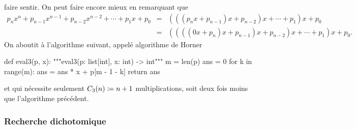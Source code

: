 \documentclass{magnolia}
\begin{document}
faire sentir.  On peut faire encore mieux en remarquant que
\begin{eqnarray*}
p_n x^n+p_{n-1}x^{n-1}+p_{n-2}x^{n-2}+\cdots+p_1 x+p_0
&=&(((p_n x+p_{n-1}) x+p_{n-2})x+\cdots+p_1)x+p_0\\
&=&((((0x + p_n) x+p_{n-1}) x+p_{n-2})x+\cdots+p_1)x+p_0.
\end{eqnarray*}
On aboutit à l'algorithme suivant, appelé algorithme de Horner
\begin{pythoncode}
def eval3(p, x):
    """eval3(p: list[int], x: int) -> int"""
    m = len(p)
    ans = 0
    for k in range(m):
        ans = ans * x + p[m - 1 - k]
    return ans
\end{pythoncode}
et qui nécessite seulement $C_3(n)\coloneqq n+1$ multiplications, soit deux fois moins que l'algorithme
précédent.

\subsubsection{Recherche dichotomique}
\end{document}
